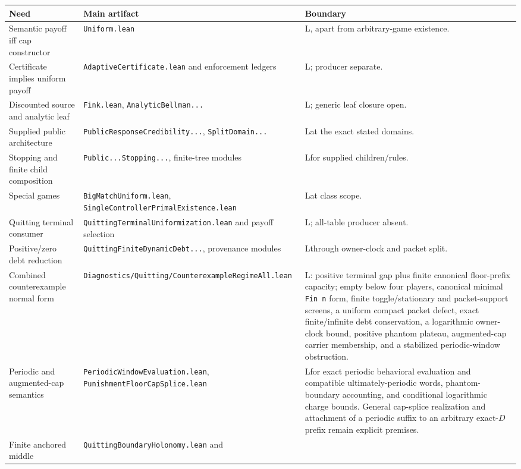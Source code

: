 \documentclass[11pt]{article}
\newcommand{\LTag}{\textsf{L}}
\newcommand{\Prod}{\LTag}
\begin{document}
\begin{longtable}{@{}p{}p{}p{}@{}}
\toprule
Need & Main artifact & Boundary\\
\midrule
\endhead
Semantic payoff iff cap constructor &
\texttt{Uniform.lean} &
\Prod, apart from arbitrary-game existence.\\
Certificate implies uniform payoff &
\texttt{AdaptiveCertificate.lean} and enforcement ledgers &
\Prod; producer separate.\\
Discounted source and analytic leaf &
\texttt{Fink.lean}, \texttt{AnalyticBellman...} &
\Prod; generic leaf closure open.\\
Supplied public architecture &
\texttt{PublicResponseCredibility...}, \texttt{SplitDomain...} &
\Prod at the exact stated domains.\\
Stopping and finite child composition &
\texttt{Public...Stopping...}, finite-tree modules &
\Prod for supplied children/rules.\\
Special games &
\texttt{BigMatchUniform.lean}, \texttt{SingleControllerPrimalExistence.lean} &
\Prod at class scope.\\
Quitting terminal consumer &
\texttt{QuittingTerminalUniformization.lean} and payoff selection &
\Prod; all-table producer absent.\\
Positive/zero debt reduction &
\texttt{QuittingFiniteDynamicDebt...}, provenance modules &
\Prod through owner-clock and packet split.\\
Combined counterexample normal form &
\texttt{Diagnostics/Quitting/CounterexampleRegimeAll.lean} &
\Prod: positive terminal gap plus finite canonical floor-prefix capacity;
empty below four players, canonical minimal \texttt{Fin n} form, finite
toggle/stationary and packet-support screens, a uniform compact packet defect,
exact finite/infinite debt conservation, a logarithmic owner-clock bound,
positive phantom plateau, augmented-cap carrier membership, and a stabilized
periodic-window obstruction.\\
Periodic and augmented-cap semantics &
\texttt{PeriodicWindowEvaluation.lean},
\texttt{PunishmentFloorCapSplice.lean} &
\Prod for exact periodic behavioral evaluation and compatible
ultimately-periodic words, phantom-boundary accounting, and conditional
logarithmic charge bounds.  General cap-splice realization and attachment of a
periodic suffix to an arbitrary exact-$D$ prefix remain explicit premises.\\
Finite anchored middle &
\texttt{QuittingBoundaryHolonomy.lean} and

\end{longtable}
\end{document}
